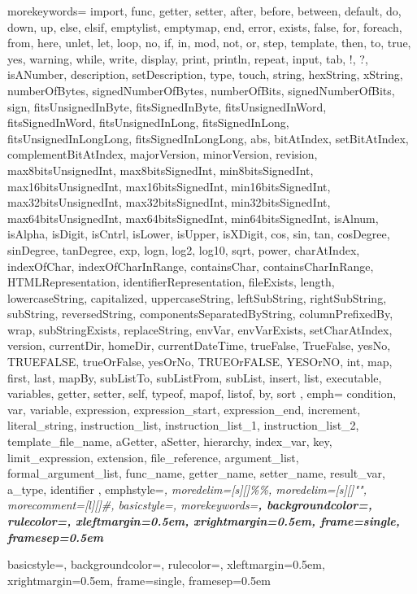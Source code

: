 {
  morekeywords= {
	  import,
	  func,
	  getter,
	  setter,
	  after,
	  before,
	  between,
	  default,
	  do,
	  down,
	  up,
	  else,
	  elsif,
	  emptylist,
	  emptymap,
	  end,
	  error,
	  exists,
	  false,
	  for,
	  foreach,
	  from,
	  here,
	  unlet,
	  let,
	  loop,
	  no,
	  if,
	  in,
	  mod,
	  not,
	  or,
	  step,
	  template,
	  then,
	  to,
	  true,
	  yes,
	  warning,
	  while,
	  write,
	  display,
	  print,
	  println,
	  repeat,
	  input,
	  tab,
	  !,
	  ?,
	  isANumber,
	  description,
	  setDescription,
	  type,
	  touch,
	  string,
	  hexString,
	  xString,
	  numberOfBytes,
	  signedNumberOfBytes,
	  numberOfBits,
	  signedNumberOfBits,
	  sign,
	  fitsUnsignedInByte,
	  fitsSignedInByte,
	  fitsUnsignedInWord,
	  fitsSignedInWord,
	  fitsUnsignedInLong,
	  fitsSignedInLong,
	  fitsUnsignedInLongLong,
	  fitsSignedInLongLong,
	  abs,
	  bitAtIndex,
	  setBitAtIndex,
	  complementBitAtIndex,
	  majorVersion,
	  minorVersion,
	  revision,
	  max8bitsUnsignedInt,
	  max8bitsSignedInt,
	  min8bitsSignedInt,
	  max16bitsUnsignedInt,
	  max16bitsSignedInt,
	  min16bitsSignedInt,
	  max32bitsUnsignedInt,
	  max32bitsSignedInt,
	  min32bitsSignedInt,
	  max64bitsUnsignedInt,
	  max64bitsSignedInt,
	  min64bitsSignedInt,
	  isAlnum,
	  isAlpha,
	  isDigit,
	  isCntrl,
	  isLower,
	  isUpper,
	  isXDigit,
	  cos,
	  sin,
	  tan,
	  cosDegree,
	  sinDegree,
	  tanDegree,
	  exp,
	  logn,
	  log2,
	  log10,
	  sqrt,
	  power,
	  charAtIndex,
	  indexOfChar,
	  indexOfCharInRange,
	  containsChar,
	  containsCharInRange,
	  HTMLRepresentation,
	  identifierRepresentation,
	  fileExists,
	  length,
	  lowercaseString,
	  capitalized,
	  uppercaseString,
	  leftSubString,
	  rightSubString,
	  subString,
	  reversedString,
	  componentsSeparatedByString,
	  columnPrefixedBy,
	  wrap,
	  subStringExists,
	  replaceString,
	  envVar,
	  envVarExists,
	  setCharAtIndex,
	  version,
	  currentDir,
	  homeDir,
	  currentDateTime,
	  trueFalse,
	  TrueFalse,
	  yesNo,
	  TRUEFALSE,
	  trueOrFalse,
	  yesOrNo,
	  TRUEOrFALSE,
	  YESOrNO,
	  int,
	  map,
	  first,
	  last,
	  mapBy,
	  subListTo,
	  subListFrom,
	  subList,
	  insert,
	  list,
	  executable,
	  variables,
	  getter,
	  setter,
	  self,
	  typeof,
	  mapof,
	  listof,
	  by,
	  sort
	},
  emph={
    condition,
    var,
    variable,
    expression,
    expression_start,
    expression_end,
    increment,
    literal_string,
    instruction_list,
    instruction_list_1,
    instruction_list_2,
    template_file_name,
    aGetter,
    aSetter,
    hierarchy,
    index_var,
    key,
    limit_expression,
    extension,
    file_reference,
    argument_list,
    formal_argument_list,
    func_name,
    getter_name,
    setter_name,
    result_var,
    a_type,
    identifier
  },
  emphstyle=\em,
  moredelim=[s][\color{blue}]{\%}{\%},
  moredelim=[s][\color{seagreen}]{"}{"},
  morecomment=[l][\color{medium-marroon}\itshape]{\#},
  basicstyle=\ttfamily\footnotesize,
  morekeywords=\bfseries,
  backgroundcolor=\color{light-blue},
  rulecolor=\color{light-blue},
  xleftmargin=0.5em,
  xrightmargin=0.5em,
  frame=single,
  framesep=0.5em
}

{
  basicstyle=\ttfamily\footnotesize\color{blue},
  backgroundcolor=\color{light-blue},
  rulecolor=\color{light-blue},
  xleftmargin=0.5em,
  xrightmargin=0.5em,
  frame=single,
  framesep=0.5em
}